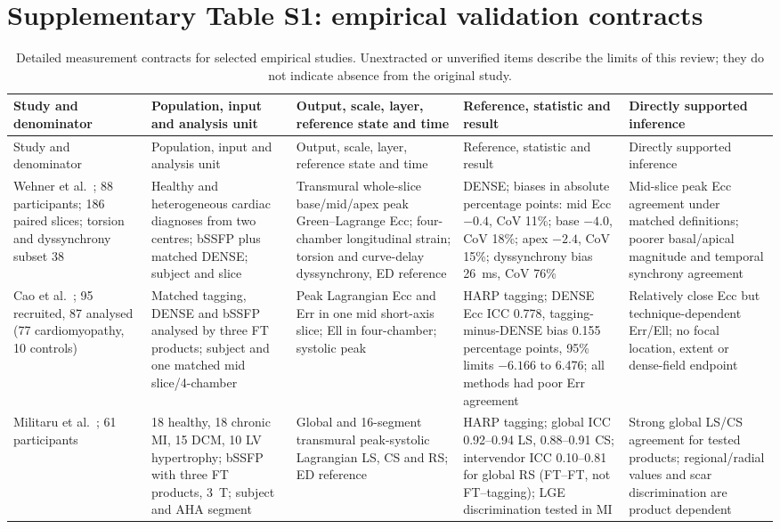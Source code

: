 \documentclass[11pt,a4paper]{article}
\begin{document}
\setcounter{table}{0}
\renewcommand{\theHtable}{supplement-numbered.\arabic{table}}
\section*{Supplementary Table S1: empirical validation contracts}

{\scriptsize\sloppy
\setlength{\tabcolsep}{3pt}
\begin{longtable}{L{0.139\textwidth}L{0.185\textwidth}L{0.196\textwidth}L{0.231\textwidth}L{0.173\textwidth}}
\caption{Detailed measurement contracts for selected empirical studies. Unextracted or unverified items describe the limits of this review; they do not indicate absence from the original study.}\\
\toprule
Study and denominator & Population, input and analysis unit & Output, scale, layer, reference state and time & Reference, statistic and result & Directly supported inference \\
\midrule
\endfirsthead
\toprule
Study and denominator & Population, input and analysis unit & Output, scale, layer, reference state and time & Reference, statistic and result & Directly supported inference \\
\midrule
\endhead
Wehner et al.~\cite{wehner2018}; 88 participants; 186 paired slices; torsion and dyssynchrony subset 38 & Healthy and heterogeneous cardiac diagnoses from two centres; bSSFP plus matched DENSE; subject and slice & Transmural whole-slice base/mid/apex peak Green--Lagrange Ecc; four-chamber longitudinal strain; torsion and curve-delay dyssynchrony, ED reference & DENSE; biases in absolute percentage points: mid Ecc $-0.4$, CoV 11\%; base $-4.0$, CoV 18\%; apex $-2.4$, CoV 15\%; dyssynchrony bias 26~ms, CoV 76\% & Mid-slice peak Ecc agreement under matched definitions; poorer basal/apical magnitude and temporal synchrony agreement \\
\addlinespace
Cao et al.~\cite{cao2018}; 95 recruited, 87 analysed (77 cardiomyopathy, 10 controls) & Matched tagging, DENSE and bSSFP analysed by three FT products; subject and one matched mid slice/4-chamber & Peak Lagrangian Ecc and Err in one mid short-axis slice; Ell in four-chamber; systolic peak & HARP tagging; DENSE Ecc ICC 0.778, tagging-minus-DENSE bias 0.155 percentage points, 95\% limits $-6.166$ to 6.476; all methods had poor Err agreement & Relatively close Ecc but technique-dependent Err/Ell; no focal location, extent or dense-field endpoint \\
\addlinespace
Militaru et al.~\cite{militaru2021}; 61 participants & 18 healthy, 18 chronic MI, 15 DCM, 10 LV hypertrophy; bSSFP with three FT products, 3~T; subject and AHA segment & Global and 16-segment transmural peak-systolic Lagrangian LS, CS and RS; ED reference & HARP tagging; global ICC 0.92--0.94 LS, 0.88--0.91 CS; intervendor ICC 0.10--0.81 for global RS (FT--FT, not FT--tagging); LGE discrimination tested in MI & Strong global LS/CS agreement for tested products; regional/radial values and scar discrimination are product dependent \\

\end{longtable}}
\end{document}
